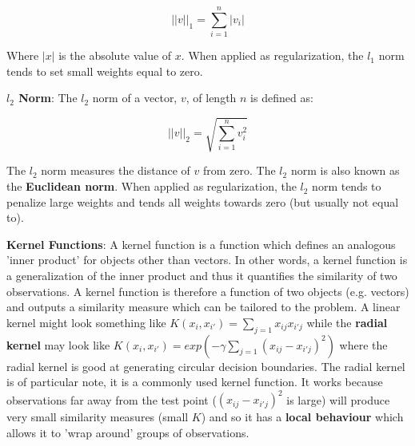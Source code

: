 $$ ||v||_{1} = \sum^{n}_{i=1}|v_{i}| $$

Where $|x|$ is the absolute value of $x$. When applied as regularization, the $l_{1}$ norm tends to set small weights equal to zero.

\textbf{$l_{2}$ Norm}: The $l_{2}$ norm of a vector, $v$, of length $n$ is defined as:

$$ ||v||_{2} = \sqrt{\sum^{n}_{i=1}v_{i}^{2}} $$

The $l_{2}$ norm measures the distance of $v$ from zero. The $l_{2}$ norm is also known as the \textbf{Euclidean norm}. When applied as regularization, the $l_{2}$ norm tends to penalize large weights and tends all weights towards zero (but usually not equal to).

\textbf{Kernel Functions}: A kernel function is a function which defines an analogous 'inner product' for objects other than vectors. In other words, a kernel function is a generalization of the inner product and thus it quantifies the similarity of two observations. A kernel function is therefore a function of two objects (e.g. vectors) and outputs a similarity measure which can be tailored to the problem. A linear kernel might look something like $K(x_{i},x_{i'})=\sum_{j=1}x_{ij}x_{i'j}$ while the \textbf{radial kernel} may look like $K(x_{i},x_{i'})=exp(-\gamma \sum_{j=1}(x_{ij}-x_{i'j})^{2})$ where the radial kernel is good at generating circular decision boundaries. The radial kernel is of particular note, it is a commonly used kernel function. It works because observations far away from the test point ($(x_{ij}-x_{i'j})^{2}$ is large) will produce very small similarity measures (small $K$) and so it has a \textbf{local behaviour} which allows it to 'wrap around' groups of observations.
